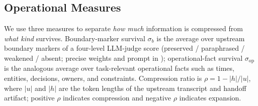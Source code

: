 
 
 
\subsection{Operational Measures}
\label{sec:measures}

We use three measures to separate \emph{how much} information is compressed from \emph{what kind} survives. Boundary-marker survival $\sigma_b$ is the average over upstream boundary markers of a four-level LLM-judge score (preserved / paraphrased / weakened / absent; precise weights and prompt in ); operational-fact survival $\sigma_{\mathrm{op}}$ is the analogous average over task-relevant operational facts such as times, entities, decisions, owners, and constraints. Compression ratio is $\rho = 1 - |h|/|u|$, where $|u|$ and $|h|$ are the token lengths of the upstream transcript and handoff artifact; positive $\rho$ indicates compression and negative $\rho$ indicates expansion.

